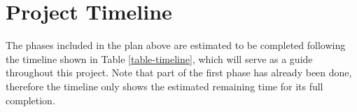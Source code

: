 \section{Project Timeline}
The phases included in the plan above are estimated to be completed following the timeline
shown in Table \ref{table-timeline}, which will serve as a guide throughout this project. Note that part of the first phase has already been done, therefore the timeline only shows the estimated remaining time for its full completion.


\begin{table}
\protect\caption{Time Line}
\label{table-timeline}
\footnotesize
\begin{center}
\end{center}
\end{table}
